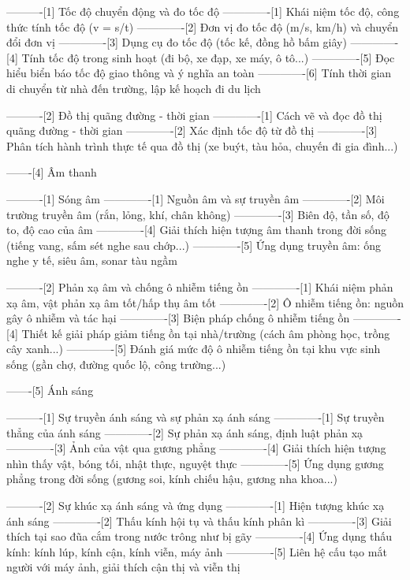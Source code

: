 ----------[1] Tốc độ chuyển động và đo tốc độ
-------------[1] Khái niệm tốc độ, công thức tính tốc độ (v = s/t)
-------------[2] Đơn vị đo tốc độ (m/s, km/h) và chuyển đổi đơn vị
-------------[3] Dụng cụ đo tốc độ (tốc kế, đồng hồ bấm giây)
-------------[4] Tính tốc độ trong sinh hoạt (đi bộ, xe đạp, xe máy, ô tô...)
-------------[5] Đọc hiểu biển báo tốc độ giao thông và ý nghĩa an toàn
-------------[6] Tính thời gian di chuyển từ nhà đến trường, lập kế hoạch đi du lịch

----------[2] Đồ thị quãng đường - thời gian
-------------[1] Cách vẽ và đọc đồ thị quãng đường - thời gian
-------------[2] Xác định tốc độ từ đồ thị
-------------[3] Phân tích hành trình thực tế qua đồ thị (xe buýt, tàu hỏa, chuyến đi gia đình...)

-------[4] Âm thanh

----------[1] Sóng âm
-------------[1] Nguồn âm và sự truyền âm
-------------[2] Môi trường truyền âm (rắn, lỏng, khí, chân không)
-------------[3] Biên độ, tần số, độ to, độ cao của âm
-------------[4] Giải thích hiện tượng âm thanh trong đời sống (tiếng vang, sấm sét nghe sau chớp...)
-------------[5] Ứng dụng truyền âm: ống nghe y tế, siêu âm, sonar tàu ngầm

----------[2] Phản xạ âm và chống ô nhiễm tiếng ồn
-------------[1] Khái niệm phản xạ âm, vật phản xạ âm tốt/hấp thụ âm tốt
-------------[2] Ô nhiễm tiếng ồn: nguồn gây ô nhiễm và tác hại
-------------[3] Biện pháp chống ô nhiễm tiếng ồn
-------------[4] Thiết kế giải pháp giảm tiếng ồn tại nhà/trường (cách âm phòng học, trồng cây xanh...)
-------------[5] Đánh giá mức độ ô nhiễm tiếng ồn tại khu vực sinh sống (gần chợ, đường quốc lộ, công trường...)

-------[5] Ánh sáng

----------[1] Sự truyền ánh sáng và sự phản xạ ánh sáng
-------------[1] Sự truyền thẳng của ánh sáng
-------------[2] Sự phản xạ ánh sáng, định luật phản xạ
-------------[3] Ảnh của vật qua gương phẳng
-------------[4] Giải thích hiện tượng nhìn thấy vật, bóng tối, nhật thực, nguyệt thực
-------------[5] Ứng dụng gương phẳng trong đời sống (gương soi, kính chiếu hậu, gương nha khoa...)

----------[2] Sự khúc xạ ánh sáng và ứng dụng
-------------[1] Hiện tượng khúc xạ ánh sáng
-------------[2] Thấu kính hội tụ và thấu kính phân kì
-------------[3] Giải thích tại sao đũa cắm trong nước trông như bị gãy
-------------[4] Ứng dụng thấu kính: kính lúp, kính cận, kính viễn, máy ảnh
-------------[5] Liên hệ cấu tạo mắt người với máy ảnh, giải thích cận thị và viễn thị

